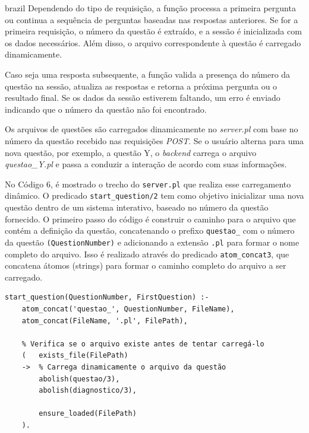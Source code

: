\begin{otherlanguage*}{brazil}
Dependendo do tipo de requisição, a função processa a primeira pergunta ou continua a sequência de perguntas baseadas nas respostas anteriores. Se for a primeira requisição, o número da questão é extraído, e a sessão é inicializada com os dados necessários. Além disso, o arquivo correspondente à questão é carregado dinamicamente. 

Caso seja uma resposta subsequente, a função valida a presença do número da questão na sessão, atualiza as respostas e retorna a próxima pergunta ou o resultado final. Se os dados da sessão estiverem faltando, um erro é enviado indicando que o número da questão não foi encontrado.


Os arquivos de questões são carregados dinamicamente no \textit{server.pl} com base no número da questão recebido nas requisições \textit{POST}. Se o usuário alterna para uma nova questão, por exemplo, a questão Y, o \textit{backend} carrega o arquivo \textit{questao\_Y.pl} e passa a conduzir a interação de acordo com suas informações. 

No Código 6, é mostrado o trecho do \texttt{server.pl} que realiza esse carregamento dinâmico. O predicado \texttt{start\_question/2} tem como objetivo inicializar uma nova questão dentro de um sistema interativo, baseado no número da questão fornecido. O primeiro passo do código é construir o caminho para o arquivo que contém a definição da questão, concatenando o prefixo \texttt{questao\_} com o número da questão \texttt{(QuestionNumber)} e adicionando a extensão \texttt{.pl} para formar o nome completo do arquivo. Isso é realizado através do predicado \texttt{atom\_concat\/3}, que concatena átomos (strings) para formar o caminho completo do arquivo a ser carregado.

\begin{lstlisting}[style=ufscthesisx_style, caption={Arquivo \textit{server.pl} - \textit{Handlers} e Manipuladores de requisições}]
start_question(QuestionNumber, FirstQuestion) :-
    atom_concat('questao_', QuestionNumber, FileName),
    atom_concat(FileName, '.pl', FilePath),

    % Verifica se o arquivo existe antes de tentar carregá-lo
    (   exists_file(FilePath)
    ->  % Carrega dinamicamente o arquivo da questão
        abolish(questao/3),
        abolish(diagnostico/3),

        ensure_loaded(FilePath)
    ).
\end{lstlisting}


\end{otherlanguage*}
